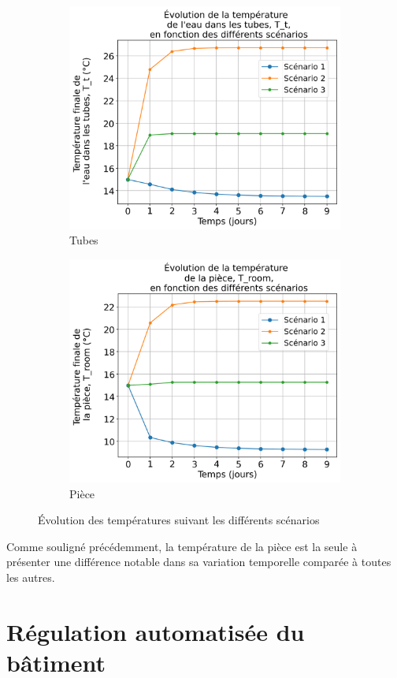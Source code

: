 \documentclass[12pt]{article}
\begin{document}
\begin{figure}
            \begin{subfigure}{0.48\textwidth}
                \centering
                \includegraphics[width=1\linewidth]{Rapport/figures/T_t.png}
                \caption{Tubes} 
                \label{fig:Tt}
            \end{subfigure}
            \begin{subfigure}{0.48\textwidth}
                \centering
                \includegraphics[width=1\linewidth]{Rapport/figures/T_room.png}
                \caption{Pièce} 
                \label{fig:Troom}
            \end{subfigure}
            
            \caption{Évolution des températures suivant les différents scénarios}
            \label{fig:Scenario}
        \end{figure}

        Comme souligné précédemment, la température de la pièce est la seule à présenter une différence notable dans sa variation temporelle comparée à toutes les autres.

\section{Régulation automatisée du bâtiment}
        


        
\newpage

\end{document}
